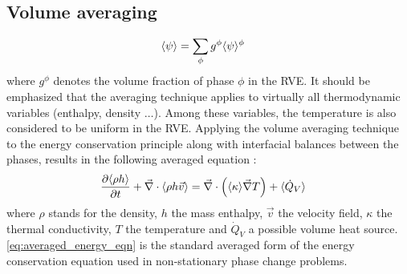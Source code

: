 \subsection{Volume averaging} 
\begin{align}
\label{eq:volume_average_psi}
& \langle \psi \rangle = \sum_\phi g^{\phi}  \langle \psi \rangle^{\phi}
\end{align}
where $g^\phi$ denotes the volume fraction of phase $\phi$ in the RVE. 
It should be emphasized that the averaging technique applies to virtually all thermodynamic variables (enthalpy, density $\dots$). 
Among these variables, the temperature is also considered to be uniform in the RVE. Applying the volume averaging technique to the energy 
conservation principle along with interfacial balances between the phases, results in the following averaged equation \citep{rappaz_numerical_2003}:
\begin{align}
\label{eq:averaged_energy_eqn}
& \frac{\partial \langle  \rho h  \rangle}{\partial t} + \vec{\nabla} \cdot \langle  \rho h \vec{v}  \rangle = \vec{\nabla} \cdot \left( \langle \kappa \rangle \vec{\nabla} T \right) + \langle \dot{Q}_V \rangle
\end{align}
where $\rho$ stands for the density, $h$ the mass enthalpy, $\vec{v}$ the velocity field, $\kappa$ the thermal conductivity, $T$ the temperature 
and $\dot{Q}_V$ a possible volume heat source. \eqref{eq:averaged_energy_eqn} is the standard averaged form of the energy conservation equation used in non-stationary phase 
change problems. 
 
